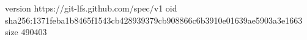 version https://git-lfs.github.com/spec/v1
oid sha256:1371feba1b8465f1543cb428939379cb908866c6b3910e01639ae5903a3e1663
size 490403
